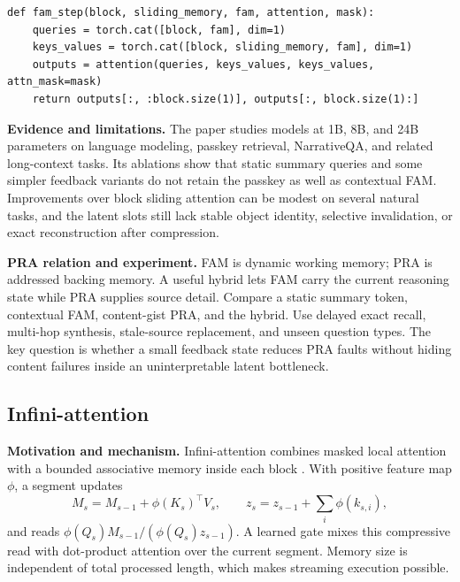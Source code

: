 \begin{lstlisting}[caption={Feedback attention memory across blocks}]
def fam_step(block, sliding_memory, fam, attention, mask):
    queries = torch.cat([block, fam], dim=1)
    keys_values = torch.cat([block, sliding_memory, fam], dim=1)
    outputs = attention(queries, keys_values, keys_values, attn_mask=mask)
    return outputs[:, :block.size(1)], outputs[:, block.size(1):]
\end{lstlisting}

\textbf{Evidence and limitations.} The paper studies models at 1B, 8B, and 24B parameters
on language modeling, passkey retrieval, NarrativeQA, and related long-context tasks. Its
ablations show that static summary queries and some simpler feedback variants do not retain
the passkey as well as contextual FAM. Improvements over block sliding attention can be
modest on several natural tasks, and the latent slots still lack stable object identity,
selective invalidation, or exact reconstruction after compression.

\textbf{PRA relation and experiment.} FAM is dynamic working memory; PRA is addressed
backing memory. A useful hybrid lets FAM carry the current reasoning state while PRA supplies
source detail. Compare a static summary token, contextual FAM, content-gist PRA, and the
hybrid. Use delayed exact recall, multi-hop synthesis, stale-source replacement, and unseen
question types. The key question is whether a small feedback state reduces PRA faults
without hiding content failures inside an uninterpretable latent bottleneck.

\subsection{Infini-attention}

\textbf{Motivation and mechanism.} Infini-attention combines masked local attention with a
bounded associative memory inside each block \citep{munkhdalai2024infini}.  With positive
feature map $\phi$, a segment updates
\begin{equation}
M_s=M_{s-1}+\phi(K_s)^\top V_s,\qquad
z_s=z_{s-1}+\sum_i\phi(k_{s,i}),
\end{equation}
and reads $\phi(Q_s)M_{s-1}/(\phi(Q_s)z_{s-1})$.  A learned gate mixes this compressive
read with dot-product attention over the current segment.  Memory size is independent of
total processed length, which makes streaming execution possible.

